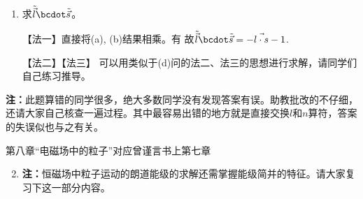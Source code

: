 \begin{enumerate}[label=\textbf{6.\arabic*}, listparindent=\parindent]
\begin{enumerate}
    \item 求$\tilde{\vec{l}}\bcdot\tilde{\vec{s}}$。
    
    【法一】直接将(a), (b)结果相乘。有
    故$\tilde{\vec{l}}\bcdot\tilde{\vec{s}} = -\vec{l\cdot s}-1$.
    
    【法二】【法三】 可以用类似于(d)问的法二、法三的思想进行求解，请同学们自己练习推导。
\end{enumerate}
{\color{red}\textbf{注：}此题算错的同学很多，绝大多数同学没有发现答案有误。助教批改的不仔细，还请大家自己核查一遍过程。其中最容易出错的地方就是直接交换$l$和$n$算符，答案的失误似也与之有关。}

\end{enumerate}

第八章“电磁场中的粒子”对应曾谨言书上第七章
\begin{enumerate}[label=\textbf{8.\arabic*}, listparindent=\parindent]

\setcounter{enumi}{1}
\item
{\color{red}\textbf{注：}}恒磁场中粒子运动的朗道能级的求解还需掌握{\color{red}能级简并的特征}。请大家复习下这一部分内容。


\end{enumerate}


